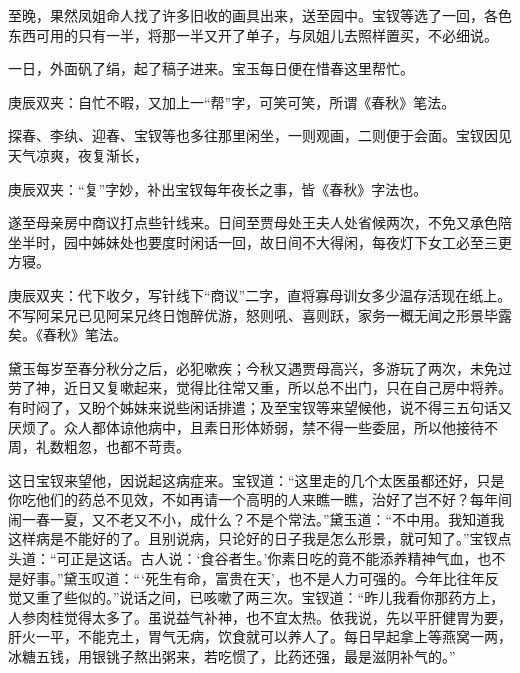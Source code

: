 \begin{parag}
    至晚，果然凤姐命人找了许多旧收的画具出来，送至园中。宝钗等选了一回，各色东西可用的只有一半，将那一半又开了单子，与凤姐儿去照样置买，不必细说。
\end{parag}


\begin{parag}
    一日，外面矾了绢，起了稿子进来。宝玉每日便在惜春这里帮忙。\begin{note}庚辰双夹：自忙不暇，又加上一“帮”字，可笑可笑，所谓《春秋》笔法。\end{note}探春、李纨、迎春、宝钗等也多往那里闲坐，一则观画，二则便于会面。宝钗因见天气凉爽，夜复渐长，\begin{note}庚辰双夹：“复”字妙，补出宝钗每年夜长之事，皆《春秋》字法也。\end{note}遂至母亲房中商议打点些针线来。日间至贾母处王夫人处省候两次，不免又承色陪坐半时，园中姊妹处也要度时闲话一回，故日间不大得闲，每夜灯下女工必至三更方寝。\begin{note}庚辰双夹：代下收夕，写针线下“商议”二字，直将寡母训女多少温存活现在纸上。不写阿呆兄已见阿呆兄终日饱醉优游，怒则吼、喜则跃，家务一概无闻之形景毕露矣。《春秋》笔法。\end{note}黛玉每岁至春分秋分之后，必犯嗽疾；今秋又遇贾母高兴，多游玩了两次，未免过劳了神，近日又复嗽起来，觉得比往常又重，所以总不出门，只在自己房中将养。有时闷了，又盼个姊妹来说些闲话排遣；及至宝钗等来望候他，说不得三五句话又厌烦了。众人都体谅他病中，且素日形体娇弱，禁不得一些委屈，所以他接待不周，礼数粗忽，也都不苛责。
\end{parag}


\begin{parag}
    这日宝钗来望他，因说起这病症来。宝钗道：“这里走的几个太医虽都还好，只是你吃他们的药总不见效，不如再请一个高明的人来瞧一瞧，治好了岂不好？每年间闹一春一夏，又不老又不小，成什么？不是个常法。”黛玉道：“不中用。我知道我这样病是不能好的了。且别说病，只论好的日子我是怎么形景，就可知了。”宝钗点头道：“可正是这话。古人说：‘食谷者生。’你素日吃的竟不能添养精神气血，也不是好事。”黛玉叹道：“‘死生有命，富贵在天’，也不是人力可强的。今年比往年反觉又重了些似的。”说话之间，已咳嗽了两三次。宝钗道：“昨儿我看你那药方上，人参肉桂觉得太多了。虽说益气补神，也不宜太热。依我说，先以平肝健胃为要，肝火一平，不能克土，胃气无病，饮食就可以养人了。每日早起拿上等燕窝一两，冰糖五钱，用银铫子熬出粥来，若吃惯了，比药还强，最是滋阴补气的。”
\end{parag}


